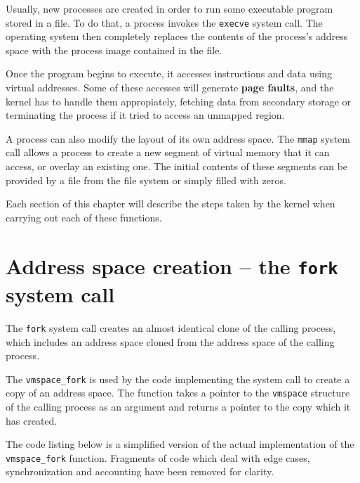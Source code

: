 \documentclass[shortabstract, english]{iithesis}
\begin{document}
Usually, new processes are created in order to run some executable program
stored in a file. To do that, a process invokes the \texttt{execve} system call.
The operating system then completely replaces the contents of the process's
address space with the process image contained in the file.

Once the program begins to execute, it accesses instructions and data using
virtual addresses. Some of these accesses will generate \textbf{page faults},
and the kernel has to handle them appropiately, fetching data from secondary
storage or terminating the process if it tried to access an unmapped region.

A process can also modify the layout of its own address space. The \texttt{mmap}
system call allows a process to create a new segment of virtual memory that it
can access, or overlay an existing one. The initial contents of these segments
can be provided by a file from the file system or simply filled with zeros.

Each section of this chapter will describe the steps taken by the kernel when
carrying out each of these functions.

\section{Address space creation -- the \texttt{fork} system call}

The \texttt{fork} system call creates an almost identical clone of the calling
process, which includes an address space cloned from the address space of the
calling process.

The \texttt{vmspace_fork} is used by the code
implementing the system call to create a copy of an address space.
The function takes a pointer to the \texttt{vmspace} structure of the
calling process as an argument and returns a pointer to the copy which it has
created.

The code listing below is a simplified version of the actual implementation of
the \texttt{vmspace_fork} function. Fragments of code which deal with
edge cases, synchronization and accounting have been removed for clarity.
\end{document}

